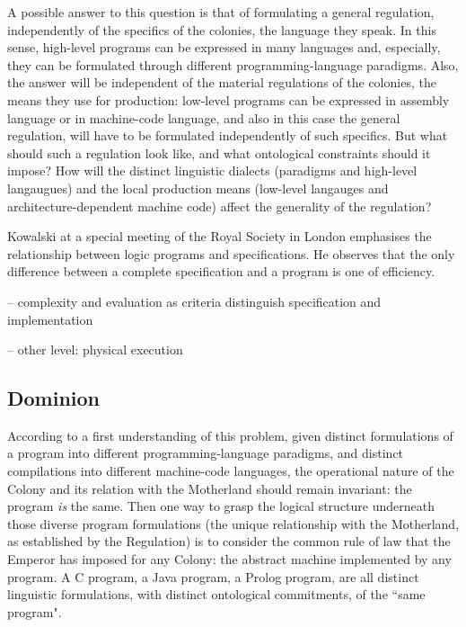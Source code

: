 \documentclass[]{article}
\begin{document}
A possible answer to this question is that of formulating a general regulation, independently of the specifics of the colonies, the language they speak. In this sense, high-level programs can be expressed in many languages and, especially, they can be formulated through different programming-language paradigms. Also, the answer will be independent of the material regulations of the colonies, the means they use for production: low-level programs can be expressed in assembly language or in machine-code language, and also in this case the general regulation, will have to be formulated independently of such specifics. But what should such a regulation look like, and what ontological constraints should it impose? How will the distinct linguistic dialects (paradigms and high-level langaugues) and the local production means (low-level langauges and architecture-dependent machine code) affect the generality of the regulation?


{\color{red}{Ray (links down to Magna Carta)}}


Kowalski at a special meeting of the Royal Society in London emphasises
the relationship between logic programs and specifications. He observes that
the only difference between a complete specification and a program is one of
efficiency.


-- complexity and evaluation as criteria distinguish specification and implementation

-- other level: physical execution


\subsection{Dominion}


{\color{red}{this passage is inspired by Nicola's note}}

According to a first understanding of this problem, given distinct formulations of a program into different programming-language paradigms, and distinct compilations into different machine-code languages, the operational nature of the Colony and its relation with the Motherland should remain invariant: the program \textit{is} the same.  Then one way to grasp the logical structure underneath those diverse program formulations (the unique relationship with the Motherland, as established by the Regulation) is to consider the common rule of law that the Emperor has imposed for any Colony: the abstract machine implemented by any program. A C program, a Java program, a Prolog program, are all distinct linguistic formulations, with distinct ontological commitments, of the ``same program".
\end{document}
